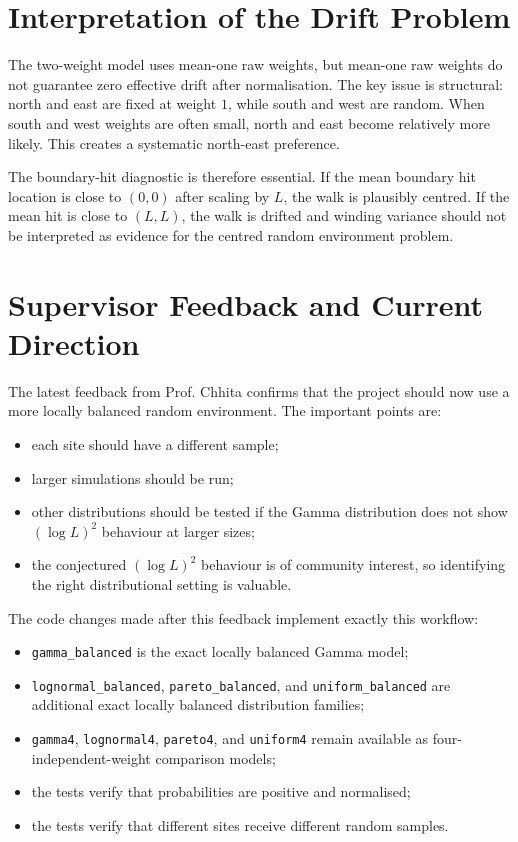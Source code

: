 \documentclass[11pt]{article}
\begin{document}
\section{Interpretation of the Drift Problem}

The two-weight model uses mean-one raw weights, but mean-one raw weights do not
guarantee zero effective drift after normalisation. The key issue is structural:
north and east are fixed at weight $1$, while south and west are random. When
south and west weights are often small, north and east become relatively more
likely. This creates a systematic north-east preference.

The boundary-hit diagnostic is therefore essential. If the mean boundary hit
location is close to $(0,0)$ after scaling by $L$, the walk is plausibly
centred. If the mean hit is close to $(L,L)$, the walk is drifted and winding
variance should not be interpreted as evidence for the centred random
environment problem.

\section{Supervisor Feedback and Current Direction}

The latest feedback from Prof. Chhita confirms that the project should now use
a more locally balanced random environment. The important points are:
\begin{itemize}
  \item each site should have a different sample;
  \item larger simulations should be run;
  \item other distributions should be tested if the Gamma distribution does not
        show $(\log L)^2$ behaviour at larger sizes;
  \item the conjectured $(\log L)^2$ behaviour is of community interest, so
        identifying the right distributional setting is valuable.
\end{itemize}

The code changes made after this feedback implement exactly this workflow:
\begin{itemize}
  \item \texttt{gamma\_balanced} is the exact locally balanced Gamma model;
  \item \texttt{lognormal\_balanced}, \texttt{pareto\_balanced}, and
        \texttt{uniform\_balanced} are additional exact locally balanced
        distribution families;
  \item \texttt{gamma4}, \texttt{lognormal4}, \texttt{pareto4}, and
        \texttt{uniform4} remain available as four-independent-weight
        comparison models;
  \item the tests verify that probabilities are positive and normalised;
  \item the tests verify that different sites receive different random samples.
\end{itemize}
\end{document}
